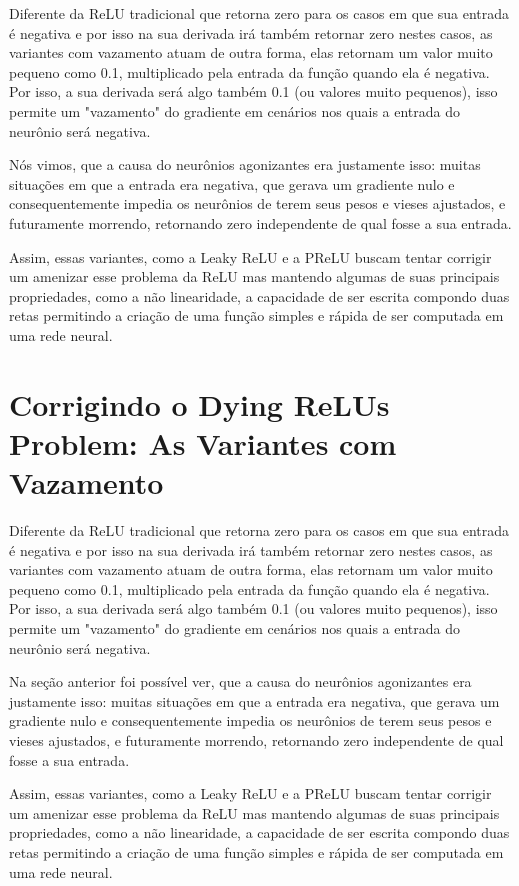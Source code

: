 Diferente da ReLU tradicional que retorna zero para os casos em que sua entrada é negativa e por isso na sua derivada irá também retornar zero nestes casos, as variantes com vazamento atuam de outra forma, elas retornam um valor muito pequeno como 0.1, multiplicado pela entrada da função quando ela é negativa. Por isso, a sua derivada será algo também 0.1 (ou valores muito pequenos), isso permite um "vazamento" do gradiente em cenários nos quais a entrada do neurônio será negativa.

Nós vimos, que a causa do neurônios agonizantes era justamente isso: muitas situações em que a entrada era negativa, que gerava um gradiente nulo e consequentemente impedia os neurônios de terem seus pesos e vieses ajustados, e futuramente morrendo, retornando zero independente de qual fosse a sua entrada.

Assim, essas variantes, como a Leaky ReLU e a PReLU buscam tentar corrigir um amenizar esse problema da ReLU mas mantendo algumas de suas principais propriedades, como a não linearidade, a capacidade de ser escrita compondo duas retas permitindo a criação de uma função simples e rápida de ser computada em uma rede neural.

\section{Corrigindo o Dying ReLUs Problem: As Variantes com Vazamento}

Diferente da ReLU tradicional que retorna zero para os casos em que sua entrada é negativa e por isso na sua derivada irá também retornar zero nestes casos, as variantes com vazamento atuam de outra forma, elas retornam um valor muito pequeno como 0.1, multiplicado pela entrada da função quando ela é negativa. Por isso, a sua derivada será algo também 0.1 (ou valores muito pequenos), isso permite um "vazamento" do gradiente em cenários nos quais a entrada do neurônio será negativa.

Na seção anterior foi possível ver, que a causa do neurônios agonizantes era justamente isso: muitas situações em que a entrada era negativa, que gerava um gradiente nulo e consequentemente impedia os neurônios de terem seus pesos e vieses ajustados, e futuramente morrendo, retornando zero independente de qual fosse a sua entrada.

Assim, essas variantes, como a Leaky ReLU e a PReLU buscam tentar corrigir um amenizar esse problema da ReLU mas mantendo algumas de suas principais propriedades, como a não linearidade, a capacidade de ser escrita compondo duas retas permitindo a criação de uma função simples e rápida de ser computada em uma rede neural.

